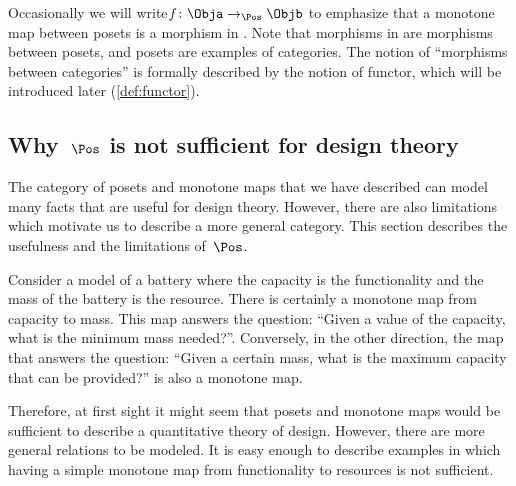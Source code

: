 Occasionally we will write$f \colon \Obja \to_{\Pos} \Objb$ to emphasize that a monotone map between posets is a morphism in \Pos. Note that morphisms in \Pos are morphisms between posets, and posets are examples of categories. The notion of ``morphisms between categories'' is formally described by the notion of functor, which will be introduced later (\cref{def:functor}).

\subsection{Why~$\Pos$ is not sufficient for design theory}

The category \Pos of posets and monotone maps that we have described can model many facts that are useful for design theory. However, there are also limitations which motivate us to describe a more general category. This section describes the usefulness and the limitations of~$\Pos$.

\begin{example}[Battery]
Consider a model of a battery where the capacity is the functionality and the mass of the battery is the resource.
There is certainly a monotone map from capacity to mass. This map answers the question: ``Given a value of the capacity, what is the minimum mass needed?''. Conversely, in the other direction, the map that answers the question: ``Given a certain mass, what is the maximum capacity that can be provided?'' is also a monotone map.
\end{example}

\begin{comment}
\begin{figure}[h!]
    \centering
    \begin{tikzcd}
    \bullet &\arrow[l] \bullet\\[-15pt]
    \text{mass} & \text{capacity}
    \end{tikzcd}
    \caption{Example of the design of a battery. \label{fig:battery-example}}
\end{figure}
\end{comment}

Therefore, at first sight it might seem that posets and monotone maps would be sufficient to describe a quantitative theory of design. However, there are more general relations to be modeled. It is easy enough to describe examples in which having a simple monotone map from functionality to resources is not sufficient.

